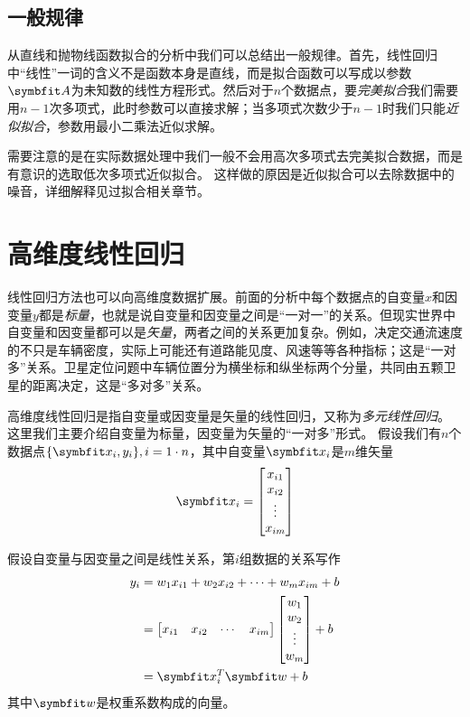 \subsection{一般规律}

从直线和抛物线函数拟合的分析中我们可以总结出一般规律。首先，线性回归中“线性”一词的含义不是函数本身是直线，而是拟合函数可以写成以参数$\MA$为未知数的线性方程形式。然后对于$n$个数据点，要\emph{完美拟合}我们需要用$n-1$次多项式，此时参数可以直接求解；当多项式次数少于$n-1$时我们只能\emph{近似拟合}，参数用最小二乘法近似求解。

需要注意的是在实际数据处理中我们一般不会用高次多项式去完美拟合数据，而是有意识的选取低次多项式近似拟合。
这样做的原因是近似拟合可以去除数据中的噪音，详细解释见过拟合相关章节。

\section{高维度线性回归}

线性回归方法也可以向高维度数据扩展。前面的分析中每个数据点的自变量$x$和因变量$y$都是\emph{标量}，也就是说自变量和因变量之间是“一对一”的关系。但现实世界中自变量和因变量都可以是\emph{矢量}，两者之间的关系更加复杂。例如，决定交通流速度的不只是车辆密度，实际上可能还有道路能见度、风速等等各种指标；这是“一对多”关系。卫星定位问题中车辆位置分为横坐标和纵坐标两个分量，共同由五颗卫星的距离决定，这是“多对多”关系。

高维度线性回归是指自变量或因变量是矢量的线性回归，又称为\emph{多元线性回归}。
这里我们主要介绍自变量为标量，因变量为矢量的“一对多”形式。
假设我们有$n$个数据点$\{\Vx_i,y_i\}, i=1\cdot n$，其中自变量$\Vx_i$是$m$维矢量
\begin{equation*}
    \Vx_i=
    \begin{bmatrix}
        x_{i1}\\
        x_{i2}\\
        \vdots\\
        x_{im}\\
    \end{bmatrix}
\end{equation*}

假设自变量与因变量之间是线性关系，第$i$组数据的关系写作
\begin{align}
    y_i &= w_1x_{i1}+w_2x_{i2}+\cdots+w_mx_{im}+b\nonumber\\
    &=\begin{bmatrix}
        x_{i1} & x_{i2} & \cdots & x_{im}
    \end{bmatrix}
    \begin{bmatrix}
        w_1\\
        w_2\\
        \vdots\\
        w_m
    \end{bmatrix}+b\nonumber\\
    &=\Vx_i^T\Vw+b
\end{align}
其中$\Vw$是权重系数构成的向量。


